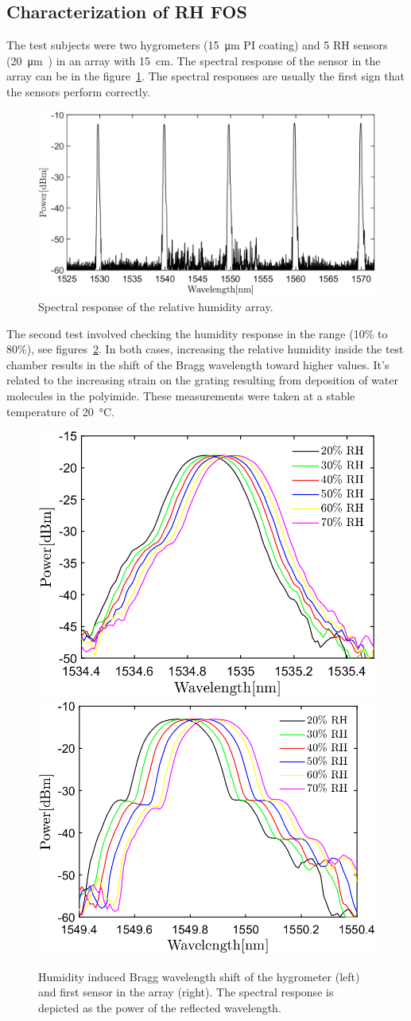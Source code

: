 \subsection{Characterization of RH FOS}
The test subjects were two hygrometers (\SI{15}{\micro\metre} PI coating) and  5 \gls{RH} sensors (\SI{20}{\micro\metre)} in an array with \SI{15}{\cm}. The spectral response of the sensor in the array can be in the figure~\ref{fig_array_wavelength}. The spectral responses are usually the first sign that the sensors perform correctly. 
\begin{figure}[!h]
\centering
\includegraphics[width=0.85\columnwidth]{Chapter5/images/rh_array.png}
\caption{Spectral response of the relative humidity array.}
\label{fig_array_wavelength}
\end{figure}
The second test involved checking the humidity response in the range (10\% to 80\%), see figures~\ref{fig_response}. In both cases, increasing the relative humidity inside the test chamber results in the shift of the Bragg wavelength toward higher values. It's related to the increasing strain on the grating resulting from deposition of water molecules in the polyimide. These measurements were taken at a stable temperature of \SI{20}{\celsius}.
\begin{figure}[!h]
\centering
\includegraphics[width=0.45\columnwidth]{Chapter5/images/rh.png}
\includegraphics[width=0.47\columnwidth]{Chapter5/images/rh_array2.png}
\caption{Humidity induced Bragg wavelength shift of the hygrometer (left) and first sensor in the array (right). The spectral response is depicted as the power of the reflected wavelength. }
\label{fig_response}
\end{figure}
